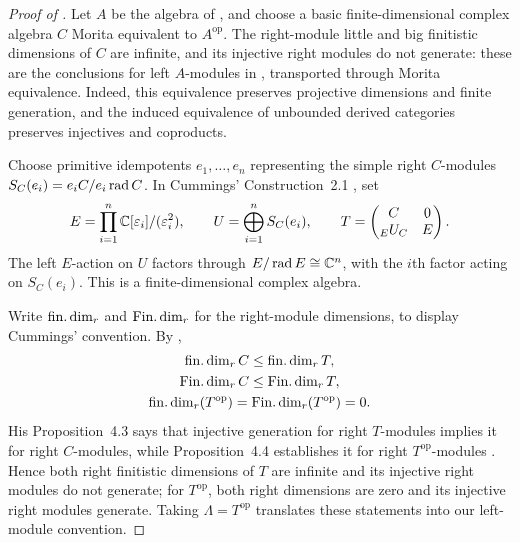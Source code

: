 \begin{proof}[Proof of ]
Let \(A\) be the algebra of , and choose a basic
finite-dimensional complex algebra \(C\) Morita equivalent to
\(A^{\mathrm{op}}\). The right-module
little and big finitistic dimensions of \(C\) are infinite, and its
injective right modules do not generate: these are the conclusions
for left \(A\)-modules in , transported through
Morita equivalence. Indeed, this equivalence preserves projective dimensions
and finite generation, and the induced equivalence of unbounded derived
categories preserves injectives and coproducts.

Choose primitive idempotents \(e_1,\ldots,e_n\) representing the simple
right \(C\)-modules \(S_C(e_i)=e_iC/e_i\operatorname{rad} C\). In Cummings'
Construction~2.1 \cite{Cummings2024}, set
\[
E=\prod_{i=1}^n\mathbb C[\varepsilon_i]/(\varepsilon_i^2),
\qquad U=\bigoplus_{i=1}^n S_C(e_i),
\qquad
T=\begin{pmatrix}C&0\\ {}_E U_C&E\end{pmatrix}.
\]
The left \(E\)-action on \(U\) factors through
\(E/\operatorname{rad} E\cong\mathbb C^n\), with the \(i\)th factor acting on \(S_C(e_i)\).
This is a finite-dimensional complex algebra.

Write \(\operatorname{fin.dim}_r\) and \(\operatorname{Fin.dim}_r\) for the right-module dimensions,
to display Cummings' convention. By
\cite[Propositions~3.2--3.3]{Cummings2024},
\[
\begin{gathered}
\operatorname{fin.dim}_r C\le\operatorname{fin.dim}_r T,\\
\operatorname{Fin.dim}_r C\le\operatorname{Fin.dim}_r T,\\
\operatorname{fin.dim}_r(T^{\mathrm{op}})=\operatorname{Fin.dim}_r(T^{\mathrm{op}})=0.
\end{gathered}
\]
His Proposition~4.3 says that injective generation for right
\(T\)-modules implies it for right \(C\)-modules, while
Proposition~4.4 establishes it for right \(T^{\mathrm{op}}\)-modules
\cite[Propositions~4.3--4.4]{Cummings2024}. Hence both right finitistic
dimensions of \(T\) are infinite and its injective right modules do not
generate; for
\(T^{\mathrm{op}}\), both right dimensions are zero and its injective
right modules generate. Taking \(\Lambda=T^{\mathrm{op}}\) translates
these statements into our left-module convention.
\end{proof}
